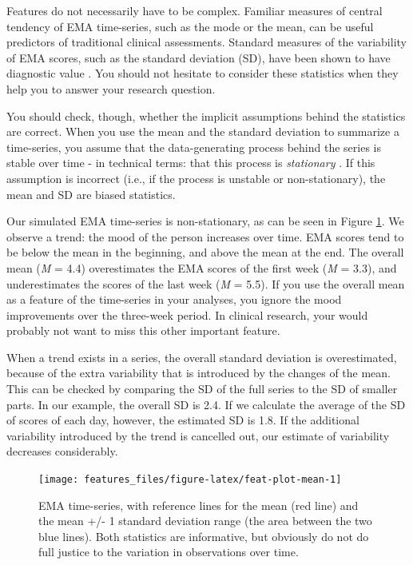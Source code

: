 \documentclass[]{book}
\begin{document}
Features do not necessarily have to be complex. Familiar measures of
central tendency of EMA time-series, such as the mode or the mean, can
be useful predictors of traditional clinical assessments. Standard
measures of the variability of EMA scores, such as the standard
deviation (SD), have been shown to have diagnostic value \citep[see,
e.g.,][]{bowen2006}. You should not hesitate to consider these
statistics when they help you to answer your research question.

 You should check, though, whether the implicit
assumptions behind the statistics are correct. When you use the mean and
the standard deviation to summarize a time-series, you assume that the
data-generating process behind the series is stable over time - in
technical terms: that this process is \emph{stationary}
\citep{wikiStationary}. If this assumption is incorrect (i.e., if the
process is unstable or non-stationary), the mean and SD are biased
statistics.

Our simulated EMA time-series is non-stationary, as can be seen in
Figure \ref{fig:feat-plot-mean}. We observe a trend: the mood of the
person increases over time. EMA scores tend to be below the mean in the
beginning, and above the mean at the end. The overall mean (\emph{M} =
4.4) overestimates the EMA scores of the first week (\emph{M} = 3.3),
and underestimates the scores of the last week (\emph{M} = 5.5). If you
use the overall mean as a feature of the time-series in your analyses,
you ignore the mood improvements over the three-week period. In clinical
research, your would probably not want to miss this other important
feature.

When a trend exists in a series, the overall standard deviation is
overestimated, because of the extra variability that is introduced by
the changes of the mean. This can be checked by comparing the SD of the
full series to the SD of smaller parts. In our example, the overall SD
is 2.4. If we calculate the average of the SD of scores of each day,
however, the estimated SD is 1.8. If the additional variability
introduced by the trend is cancelled out, our estimate of variability
decreases considerably.

\begin{figure}

{\centering \texttt{[image: features\_files/figure-latex/feat-plot-mean-1]} 

}

\caption{EMA time-series, with reference lines for the mean (red line) and the mean +/- 1 standard deviation range (the area between the two blue lines). Both statistics are informative, but obviously do not do full justice to the variation in observations over time.}\label{fig:feat-plot-mean}
\end{figure}
\end{document}
